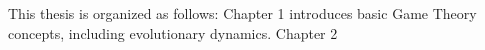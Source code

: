 \documentclass[10pt,a4paper]{report}
\begin{document}
This thesis is organized as follows: Chapter 1 introduces basic Game Theory concepts, including evolutionary dynamics. Chapter 2 
\end{document}
